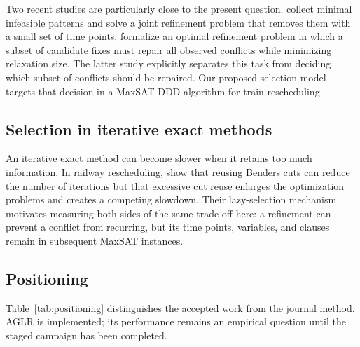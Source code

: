 \documentclass[preprint,12pt,authoryear]{elsarticle}
\begin{document}
Two recent studies are particularly close to the present question.
\citet{ShuXuBaldacci2026} collect minimal infeasible patterns and solve a joint
refinement problem that removes them with a small set of time points.
\citet{HelberEtAl2026} formalize an optimal refinement problem in which a subset
of candidate fixes must repair all observed conflicts while minimizing
relaxation size. The latter study explicitly separates this task from deciding
which subset of conflicts should be repaired. Our proposed selection model
targets that decision in a MaxSAT-DDD algorithm for train rescheduling.

\subsection{Selection in iterative exact methods}

An iterative exact method can become slower when it retains too much
information. In railway rescheduling, \citet{LeutwilerBonetCorman2023} show that
reusing Benders cuts can reduce the number of iterations but that excessive cut
reuse enlarges the optimization problems and creates a competing slowdown.
Their lazy-selection mechanism motivates measuring both sides of the same
trade-off here: a refinement can prevent a conflict from recurring, but its
time points, variables, and clauses remain in subsequent MaxSAT instances.

\subsection{Positioning}

Table~\ref{tab:positioning} distinguishes the accepted work from the journal
method. AGLR is implemented; its performance remains an empirical question
until the staged campaign has been completed.
\end{document}
